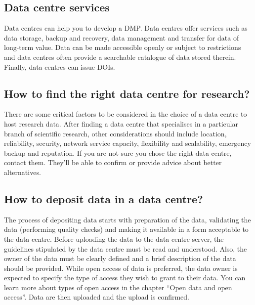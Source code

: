 \documentclass[
]{book}
\begin{document}
\hypertarget{data-centre-services}{%
\subsection*{Data centre services}\label{data-centre-services}}

Data centres can help you to develop a DMP. Data centres offer services such as data storage, backup and recovery, data management and transfer for data of long-term value. Data can be made accessible openly or subject to restrictions and data centres often provide a searchable catalogue of data stored therein. Finally, data centres can issue DOIs.

\hypertarget{how-to-find-the-right-data-centre-for-research}{%
\subsection*{How to find the right data centre for research?}\label{how-to-find-the-right-data-centre-for-research}}

There are some critical factors to be considered in the choice of a data centre to host research data. After finding a data centre that specialises in a particular branch of scientific research, other considerations should include location, reliability, security, network service capacity, flexibility and scalability, emergency backup and reputation. If you are not sure you chose the right data centre, contact them. They'll be able to confirm or provide advice about better alternatives.

\hypertarget{how-to-deposit-data-in-a-data-centre}{%
\subsection*{How to deposit data in a data centre?}\label{how-to-deposit-data-in-a-data-centre}}

The process of depositing data starts with preparation of the data, validating the data (performing quality checks) and making it available in a form acceptable to the data centre. Before uploading the data to the data centre server, the guidelines stipulated by the data centre must be read and understood. Also, the owner of the data must be clearly defined and a brief description of the data should be provided. While open access of data is preferred, the data owner is expected to specify the type of access they wish to grant to their data. You can learn more about types of open access in the chapter ``Open data and open access''. Data are then uploaded and the upload is confirmed.
\end{document}
